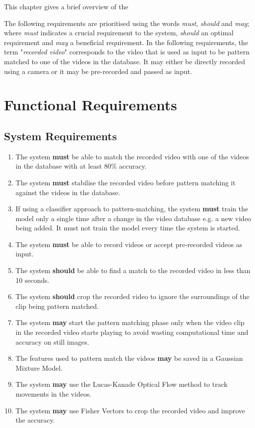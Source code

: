 This chapter gives a brief overview of the 

The following requirements are prioritised using the words \textit{must}, \textit{should} and \textit{may}; where \textit{must} indicates a crucial requirement to the system, \textit{should} an optimal requirement and \textit{may} a beneficial requirement. In the following requirements, the term "\textit{recorded video}" corresponds to the video that is used as input to be pattern matched to one of the videos in the database. It may either be directly recorded using a camera or it may be pre-recorded and passed as input.

\section{Functional Requirements}

\subsection{System Requirements}

\begin{enumerate}
    \item The system \textbf{must} be able to match the recorded video with one of the videos in the database with at least 80\% accuracy.
    \item The system \textbf{must} stabilise the recorded video before pattern matching it against the videos in the database.
    \item If using a classifier approach to pattern-matching, the system \textbf{must} train the model only a single time after a change in the video database e.g. a new video being added. It must not train the model every time the system is started.
    \item The system \textbf{must} be able to record videos or accept pre-recorded videos as input.
    \item The system \textbf{should} be able to find a match to the recorded video in less than 10 seconds.
    \item The system \textbf{should} crop the recorded video to ignore the surroundings of the clip being pattern matched.
    \item The system \textbf{may} start the pattern matching phase only when the video clip in the recorded video starts playing to avoid wasting computational time and accuracy on still images.
    \item The features used to pattern match the videos \textbf{may} be saved in a Gaussian Mixture Model.
    \item The system \textbf{may} use the Lucas-Kanade Optical Flow method to track movements in the videos.
    \item The system \textbf{may} use Fisher Vectors to crop the recorded video and improve the accuracy.
\end{enumerate}

